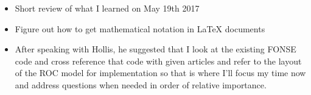 \documentclass[letterpaper,index=totoc,hyperref,openany]{labbook} %
\begin{document}

\begin{itemize}
	\item Short review of what I learned on May 19th 2017
	\item Figure out how to get mathematical notation in LaTeX documents
	\item After speaking with Hollis, he suggested that I look at the existing FONSE code and cross reference that code with given articles and refer to the layout of the ROC model for implementation so that is where I'll focus my time now and address questions when needed in order of relative importance.
\end{itemize}

\end{document}
